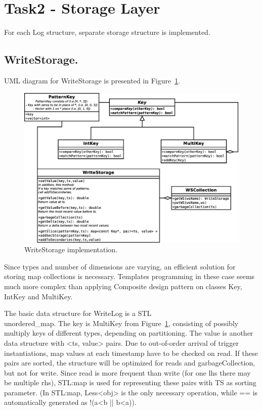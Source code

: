 \documentclass{sig-semester}
\begin{document}
\section{Task2 - Storage Layer }
\vspace{2mm}
For each Log structure, separate storage structure is implemented.

\subsection{WriteStorage.} 
UML diagram for WriteStorage is presented in Figure~\ref{fig:writeStorage}.

\begin{figure}
\centering
\includegraphics[width=6in]{WriteStorage.eps}
\vspace{-3mm}
\caption{WriteStorage implementation.}
\label{fig:writeStorage}
\vspace{-2mm}
\end{figure}

Since types and number of dimensions are varying, an efficient solution for storing map collections is necessary. Templates programming in these case seems much more complex than applying Composite design pattern on classes Key, IntKey and MultiKey.

The basic data structure for WriteLog is a STL \\ unordered\_map. The key is MultiKey from Figure~\ref{fig:writeStorage}, consisting of possibly multiply keys of different types, depending on partitioning. The value is another data structure with <ts, value> pairs. Due to out-of-order arrival of trigger instantiations, map values at each timestamp have to be checked on read. If these pairs are sorted, the structure will be optimized for reads and garbageCollection, but not for write. Since read is more frequent than write (for one lhs there may be multiple rhs), STL:map is used for representing these pairs with TS as sorting parameter. (In STL:map, Less<obj> is the only necessary operation, while == is automatically generated as !(a<b || b<a)).
\end{document}
